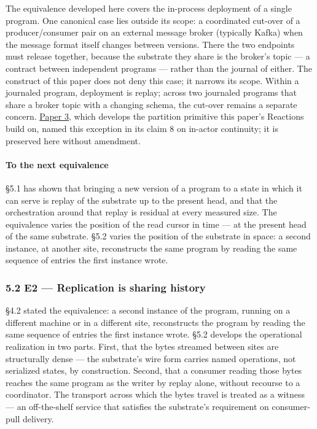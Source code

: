 \documentclass[
]{article}
\begin{document}
The equivalence developed here covers the in-process deployment of a
single program. One canonical case lies outside its scope: a coordinated
cut-over of a producer/consumer pair on an external message broker
(typically Kafka) when the message format itself changes between
versions. There the two endpoints must release together, because the
substrate they share is the broker's topic --- a contract between
independent programs --- rather than the journal of either. The
construct of this paper does not deny this case; it narrows its scope.
Within a journaled program, deployment is replay; across two journaled
programs that share a broker topic with a changing schema, the cut-over
remains a separate concern. \href{03-reactions-and-partition.md}{Paper
3}, which develops the partition primitive this paper's Reactions build
on, named this exception in its claim 8 on in-actor continuity; it is
preserved here without amendment.

\paragraph{To the next equivalence}\label{to-the-next-equivalence}

§5.1 has shown that bringing a new version of a program to a state in
which it can serve is replay of the substrate up to the present head,
and that the orchestration around that replay is residual at every
measured size. The equivalence varies the position of the read cursor in
time --- at the present head of the same substrate. §5.2 varies the
position of the substrate in space: a second instance, at another site,
reconstructs the same program by reading the same sequence of entries
the first instance wrote.

\subsubsection{5.2 E2 --- Replication is sharing
history}\label{e2-replication-is-sharing-history}

§4.2 stated the equivalence: a second instance of the program, running
on a different machine or in a different site, reconstructs the program
by reading the same sequence of entries the first instance wrote. §5.2
develops the operational realization in two parts. First, that the bytes
streamed between sites are structurally dense --- the substrate's wire
form carries named operations, not serialized states, by construction.
Second, that a consumer reading those bytes reaches the same program as
the writer by replay alone, without recourse to a coordinator. The
transport across which the bytes travel is treated as a witness --- an
off-the-shelf service that satisfies the substrate's requirement on
consumer-pull delivery.
\end{document}
